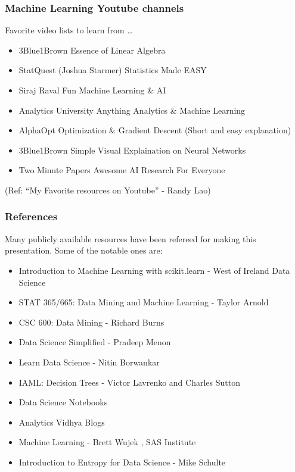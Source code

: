 \begin{frame}\frametitle{Machine Learning Youtube channels}
Favorite video lists to learn from \ldots

\footnotesize
\begin{itemize}
\item 3Blue1Brown
Essence of Linear Algebra
\item StatQuest (Joshua Starmer)
Statistics Made EASY
\item Siraj Raval
Fun Machine Learning \& AI  
\item Analytics University
Anything Analytics \& Machine Learning
\item AlphaOpt
Optimization \& Gradient Descent (Short and easy explanation)
\item 3Blue1Brown
Simple Visual Explaination on Neural Networks
\item Two Minute Papers
Awesome AI Research For Everyone 
\end{itemize}

(Ref: ``My Favorite resources on Youtube'' - Randy Lao)
\end{frame}


\begin{frame}\frametitle{References}

Many publicly available resources have been refereed for making this presentation. Some of the notable ones are:
\footnotesize
\begin{itemize}
\item Introduction to Machine Learning with scikit.learn - West of Ireland Data Science
\item STAT 365/665: Data Mining and Machine Learning - Taylor Arnold
\item CSC 600: Data Mining - Richard Burns
\item Data Science Simplified - Pradeep Menon %
\item Learn Data Science - Nitin Borwankar %
\item IAML: Decision Trees	- Victor Lavrenko and Charles Sutton	
\item Data Science Notebooks %
\item Analytics Vidhya Blogs %
\item Machine Learning - Brett Wujek , SAS Institute
\item Introduction to Entropy for Data Science - Mike Schulte
\end{itemize}
\end{frame}
